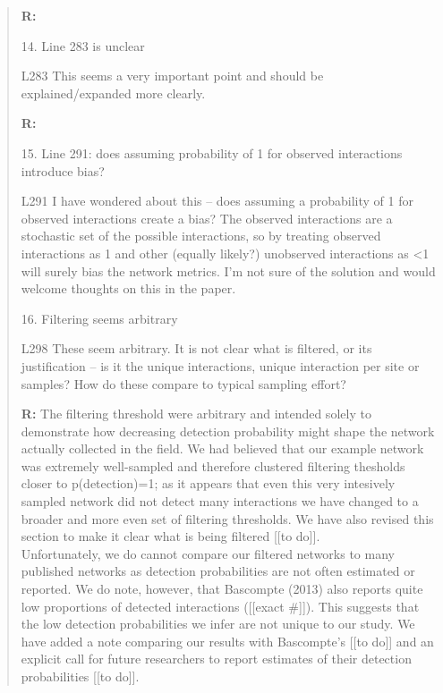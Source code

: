 \documentclass[12pt]{letter}
\newenvironment{refquote}{\bigskip \begin{it}}{\end{it}\smallskip}
\begin{document}
\begin{quotation}
	\textbf{R:}

	14. Line 283 is unclear

	L283 This seems a very important point and should be explained/expanded more clearly.

	\textbf{R:}

	15. Line 291: does assuming probability of 1 for observed interactions introduce bias?

	\begin{refquote}
	L291 I have wondered about this – does assuming a probability of 1 for observed interactions create a bias? The observed interactions are a stochastic set of the possible interactions, so by treating observed interactions as 1 and other (equally likely?) unobserved interactions as <1 will surely bias the network metrics. I’m not sure of the solution and would welcome thoughts on this in the paper.
	\end{refquote}

	16. Filtering seems arbitrary

	\begin{refquote}
	L298 These seem arbitrary. It is not clear what is filtered, or its justification – is it the unique interactions, unique interaction per site or samples? How do these compare to typical sampling effort?
	\end{refquote}

	\textbf{R:} The filtering threshold were arbitrary and intended solely to demonstrate how decreasing detection probability might shape the network actually collected in the field. We had believed that our example network was extremely well-sampled and therefore clustered filtering thesholds closer to p(detection)=1; as it appears that even this very intesively sampled network did not detect many interactions we have changed to a broader and more even set of filtering thresholds. We have also revised this section to make it clear what is being filtered [[to do]].\\
	Unfortunately, we do cannot compare our filtered networks to many published networks as detection probabilities are not often estimated or reported. We do note, however, that Bascompte (2013) also reports quite low proportions of detected interactions ([[exact #]]). This suggests that the low detection probabilities we infer are not unique to our study. We have added a note comparing our results with Bascompte's [[to do]] and an explicit call for future researchers to report estimates of their detection probabilities [[to do]].


\end{quotation}
\end{document}
